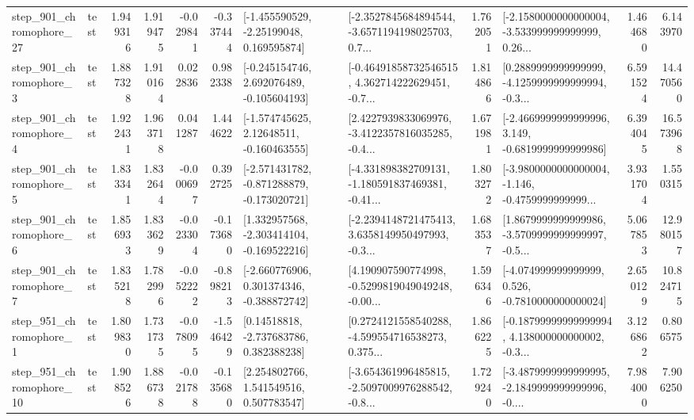 \begin{tabular}{llrrrrllrlrr}
  step\_901\_chromophore\_27 &      test &      1.949316 &    1.919475 &     -0.029841 & -0.337444 &    [-1.455590529, -2.25199048, 0.169595874] &  [-2.3527845684894544, -3.6571194198025703, 0.7... &       1.762051 &  [-2.1580000000000004, -3.533999999999999, 0.26... &            1.464680 &          6.143970 \\
   step\_901\_chromophore\_3 &      test &      1.887328 &    1.910164 &      0.022836 &  0.982338 &   [-0.245154746, 2.692076489, -0.105604193] &  [-0.46491858732546515, 4.362714222629451, -0.7... &       1.814866 &  [0.2889999999999999, -4.1259999999999994, -0.3... &            6.591524 &         14.470560 \\
   step\_901\_chromophore\_4 &      test &      1.922431 &    1.963718 &      0.041287 &  1.444622 &    [-1.574745625, 2.12648511, -0.160463555] &  [2.4227939833069976, -3.4122357816035285, -0.4... &       1.671981 &  [-2.4669999999999996, 3.149, -0.6819999999999986] &            6.394045 &         16.573968 \\
   step\_901\_chromophore\_5 &      test &      1.833341 &    1.832644 &     -0.000697 &  0.392725 &  [-2.571431782, -0.871288879, -0.173020721] &  [-4.331898382709131, -1.180591837469381, -0.41... &       1.803272 &  [-3.9800000000000004, -1.146, -0.4759999999999... &            3.931704 &          1.550315 \\
   step\_901\_chromophore\_6 &      test &      1.856933 &    1.833629 &     -0.023304 & -0.173680 &   [1.332957568, -2.303414104, -0.169522216] &  [-2.2394148721475413, 3.6358149950497993, -0.3... &       1.683537 &  [1.8679999999999986, -3.5709999999999997, -0.5... &            5.067853 &         12.980157 \\
   step\_901\_chromophore\_7 &      test &      1.835218 &    1.782996 &     -0.052222 & -0.898213 &   [-2.660776906, 0.301374346, -0.388872742] &  [4.190907590774998, -0.5299819049049248, -0.00... &       1.596346 &   [-4.074999999999999, 0.526, -0.7810000000000024] &            2.650129 &         10.824715 \\
   step\_951\_chromophore\_1 &      test &      1.809830 &    1.731735 &     -0.078095 & -1.546429 &     [0.14518818, -2.737683786, 0.382388238] &  [0.2724121558540288, -4.599554716538273, 0.375... &       1.866225 &  [-0.18799999999999994, 4.138000000000002, -0.3... &            3.126862 &          0.806575 \\
  step\_951\_chromophore\_10 &      test &      1.908526 &    1.886738 &     -0.021788 & -0.135680 &     [2.254802766, 1.541549516, 0.507783547] &  [-3.654361996485815, -2.5097009976288542, -0.8... &       1.729240 &  [-3.4879999999999995, -2.1849999999999996, -0.... &            7.984000 &          7.906250 \\

\end{tabular}
